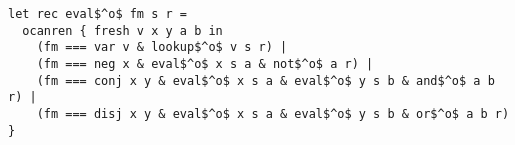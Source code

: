 \begin{lstlisting}
let rec eval$^o$ fm s r =
  ocanren { fresh v x y a b in
    (fm === var v & lookup$^o$ v s r) |
    (fm === neg x & eval$^o$ x s a & not$^o$ a r) |
    (fm === conj x y & eval$^o$ x s a & eval$^o$ y s b & and$^o$ a b r) |
    (fm === disj x y & eval$^o$ x s a & eval$^o$ y s b & or$^o$ a b r) }
  \end{lstlisting}